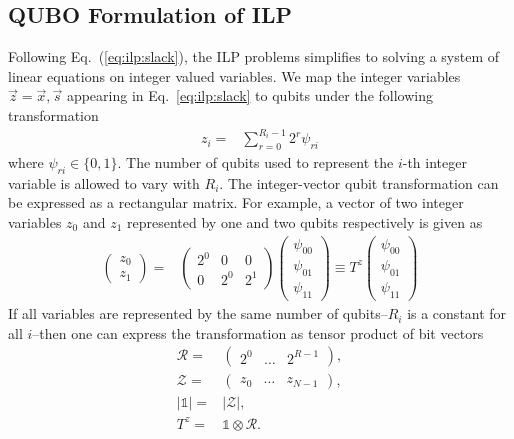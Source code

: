 \documentclass[prd,twocolumn,tightenlines,preprintnumbers,showpacs,superscriptaddress,notitlepage,nofootinbib,eqsecnum,floatfix,longbibliography,aps,10pt]{revtex4-2}
\begin{document}
\subsection{QUBO Formulation of ILP}
\label{sec:results:qa1}
Following Eq.~(\ref{eq:ilp:slack}), the ILP problems simplifies to solving a system of linear equations on integer valued variables. We map the integer variables $\vec z = \vec x, \vec s$ appearing in Eq.~\eqref{eq:ilp:slack} to qubits under the following transformation~\cite{Chang:2018uoc}
\begin{align}
 z_i = & \sum_{r=0}^{R_i-1} 2^r \psi_{ri}
 \label{eq:int_to_bin}
\end{align}
where $\psi_{ri} \in \{0, 1\}$. The number of qubits used to represent the $i$-th integer variable is allowed to vary with $R_i$.
The integer-vector qubit transformation can be expressed as a rectangular matrix.
For example, a vector of two integer variables $z_0$ and $z_1$ represented by one and two qubits respectively is given as
\begin{align}
 \begin{pmatrix}
  z_0 \\
  z_1
 \end{pmatrix}
 = &
 \begin{pmatrix}
  2^0 & 0   & 0   \\
  0   & 2^0 & 2^1
 \end{pmatrix}
 \begin{pmatrix}
  \psi_{00} \\
  \psi_{01} \\
  \psi_{11}
 \end{pmatrix}
 \equiv T^z \begin{pmatrix}
  \psi_{00} \\
  \psi_{01} \\
  \psi_{11}
 \end{pmatrix}
\end{align}
If all variables are represented by the same number of qubits--$R_i$ is a constant for all $i$--then one can express the transformation as tensor product of bit vectors
\begin{align}
 \mathcal{R} =  & \begin{pmatrix} 2^0 & \dots & 2^{R-1}\end{pmatrix},    \\
 \mathcal{Z} =  & \begin{pmatrix} z_0 & \dots & z_{N-1}\end{pmatrix},    \\
 |\mathds{1}| = & |\mathcal{Z}|,                 \\
 T^z =          & \mathds{1}\otimes \mathcal{R}.
\end{align}
\end{document}
